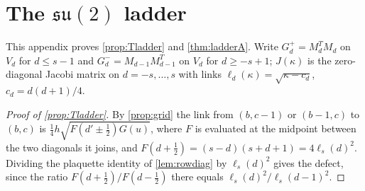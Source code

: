 \section{The \texorpdfstring{$\mathfrak{su}(2)$}{su(2)} ladder}\label{app:ladder}

This appendix proves \cref{prop:Tladder} and \cref{thm:ladderA}. Write
$G^+_d=M_d^TM_d$ on $V_d$ for $d\le s-1$ and $G^-_d=M_{d-1}M_{d-1}^T$ on $V_d$ for
$d\ge-s+1$; $J(\kappa)$ is the zero-diagonal Jacobi matrix on $d=-s,\dots,s$ with links
$\ell_d(\kappa)=\sqrt{\kappa-c_d}$, $c_d=d(d+1)/4$.

\begin{proof}[Proof of \cref{prop:Tladder}]
By \cref{prop:grid} the link from $(b,c-1)$ or $(b-1,c)$ to $(b,c)$ is
$\frac14h\sqrt{F(d'\pm\frac12)G(u)}$, where $F$ is evaluated at the midpoint between the
two diagonals it joins, and $F(d+\frac12)=(s-d)(s+d+1)=4\ell_s(d)^2$. Dividing the plaquette
identity of \cref{lem:rowdiag} by $\ell_s(d)^2$ gives the defect, since the ratio
$F(d+\frac12)/F(d-\frac12)$ there equals $\ell_s(d)^2/\ell_s(d-1)^2$.
\end{proof}

